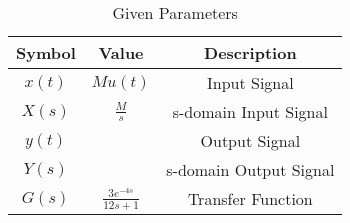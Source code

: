 \begin{table}[!h]
    \centering
    \begin{tabular}{|c|c|c|}
    \hline
       \textbf{Symbol}  & \textbf{Value} & \textbf{Description}\\
    \hline
        $x(t)$ & $Mu(t)$ & Input Signal\\
    \hline
        $X(s)$ & $\frac{M}{s}$ & s-domain Input Signal\\
    \hline
        $y(t)$ &  & Output Signal\\
    \hline
        $Y(s)$ & & s-domain Output Signal\\
    \hline
       $G(s)$ & $\frac{3e^{-4s}}{12s + 1}$ & Transfer Function\\
    \hline
    \end{tabular}
    \caption{Given Parameters}
    \label{tab:1_gate.21.ch.52}
\end{table}
